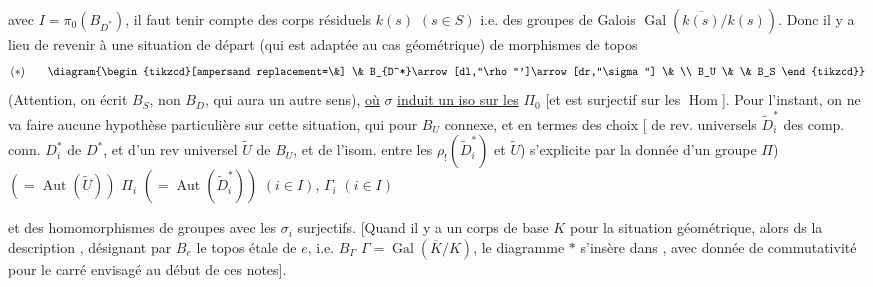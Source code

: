 avec $I=\pi_0(B_{D^*})$, il faut tenir compte des corps résiduels $k(s)$ $(s\in S)$ i.e. des groupes de Galois $\operatorname{Gal}(\overline{k(s)}/k(s))$. Donc il y a lieu de revenir à une situation de départ (qui est adaptée au cas géométrique) de morphismes de topos 
\[
 (*)\qquad
 \diagram{\begin{tikzcd}[ampersand replacement=\&]
 \& B_{D^*}\arrow[dl,"\rho"']\arrow[dr,"\sigma"] \& \\
 B_U \& \& B_S
 \end{tikzcd}}
\]
(Attention, on écrit $B_S$, non $B_D$, qui aura un autre sens), \uline{où} $\sigma$ \uline{induit un iso sur les} $\Pi_0$ [et est surjectif sur les $\operatorname{Hom}$]. Pour l'instant, on ne va faire aucune hypothèse particulière sur cette situation, qui pour $B_U$ connexe, et en termes des choix
[ de rev. universels $\widetilde D_i^*$ des comp. conn. $D_i^*$ de $D^*$, et d'un rev universel $\widetilde U$ de $B_U$, et de l'isom. entre les $\rho_!(\widetilde D_i^*)$ et $\widetilde U$) s'explicite par la donnée d'un groupe  $\Pi$) $(=\operatorname{Aut}(\widetilde U))$   $\Pi_i$ $(=\operatorname{Aut}(\widetilde D_i^*))$  $(i\in I)$, $\Gamma_i$ $(i\in I)$


et des homomorphismes de groupes
avec les $\sigma_i$ surjectifs. 
[Quand il y a un corps de base $K$ pour la situation géométrique, alors ds la description ,  désignant par $B_e$ le topos étale  de $e$, i.e. $B_\Gamma$  $\Gamma=\operatorname{Gal}(\overline K/K)$, le diagramme $*$ s'insère dans
,
avec donnée de commutativité pour le carré envisagé au début de ces notes].

